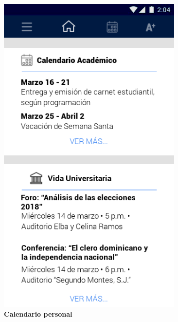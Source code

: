 \documentclass[12pt]{article}
\begin{document}
\begin{figure}[t]
\begin{minipage}[t]{0.45\textwidth}
		\includegraphics[width=0.825\textwidth]{img/3.png}
	\end{minipage}\hfill
	\begin{minipage}[t]{0.45\textwidth}
		\centering
		\caption{\textbf{Calendario personal}}
		\label{fig:calendario}

\end{minipage}
\end{figure}
\end{document}
